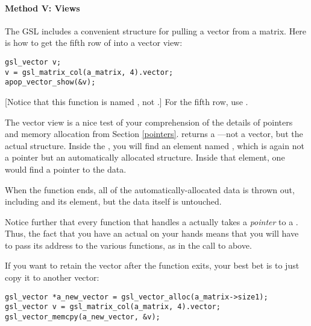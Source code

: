 \paragraph{Method V: Views}
The GSL includes a convenient structure for pulling a vector from a
matrix. Here is how to get the fifth row of  into a vector view:

\begin{lstlisting}
gsl_vector v;
v = gsl_matrix_col(a_matrix, 4).vector;
apop_vector_show(&v);
\end{lstlisting}
[Notice that this function is named , not .]
For the fifth row, use . 

The vector view is a nice test of your comprehension of the details of
pointers and memory allocation from Section \ref{pointers}.
 returns a
---not a vector, but the actual
structure.  Inside the , you will find 
an element named , which is again not a pointer but an
automatically allocated structure. Inside that 
element, one would find a pointer to the data.

When the function ends, all of the automatically-allocated data is
thrown out, including  and its
 element, but the data itself is untouched.

Notice further that every function that handles a
 actually takes a {\em pointer} to a 
. Thus, the fact that you have an actual 
 on your hands means that you will have to pass
its address to the various functions, as in the call to
 above.

If you want to retain the vector after the function exits, your best bet
is to just copy it to another vector:

\begin{lstlisting}
gsl_vector *a_new_vector = gsl_vector_alloc(a_matrix->size1);
gsl_vector v = gsl_matrix_col(a_matrix, 4).vector;
gsl_vector_memcpy(a_new_vector, &v);
\end{lstlisting}


